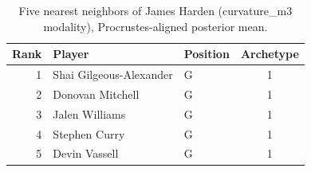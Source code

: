 \begin{table}[htbp]
  \centering\small
  \begin{tabular}{rllc}
    \toprule
    Rank & Player & Position & Archetype \\
    \midrule
    1 & Shai Gilgeous-Alexander & G & 1 \\
    2 & Donovan Mitchell & G & 1 \\
    3 & Jalen Williams & G & 1 \\
    4 & Stephen Curry & G & 1 \\
    5 & Devin Vassell & G & 1 \\
    \bottomrule
  \end{tabular}
  \caption{Five nearest neighbors of James Harden (curvature_m3 modality), Procrustes-aligned posterior mean.}
  \label{tab:James_Harden_neighbors_curvature_m3}
\end{table}

